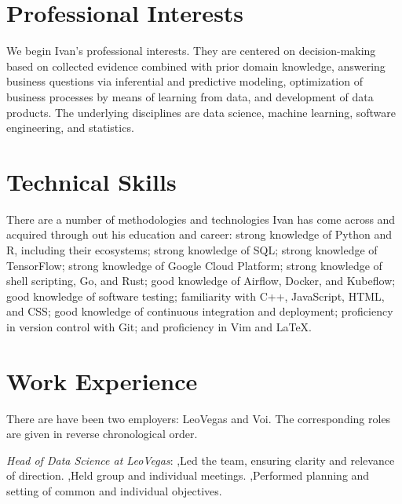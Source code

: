 \documentclass[journal]{IEEEtran}
\begin{document}
\section{Professional Interests} 

We begin Ivan's professional interests. They are centered on decision-making
based on collected evidence combined with prior domain knowledge, answering
business questions via inferential and predictive modeling, optimization of
business processes by means of learning from data, and development of data
products. The underlying disciplines are data science, machine learning,
software engineering, and statistics.

\section{Technical Skills} 

There are a number of methodologies and technologies Ivan has come across and
acquired through out his education and career: strong knowledge of Python and R,
including their ecosystems; strong knowledge of SQL; strong knowledge of
TensorFlow; strong knowledge of Google Cloud Platform; strong knowledge of shell
scripting, Go, and Rust; good knowledge of Airflow, Docker, and Kubeflow; good
knowledge of software testing; familiarity with C++, JavaScript, HTML, and CSS;
good knowledge of continuous integration and deployment; proficiency in version
control with Git; and proficiency in Vim and LaTeX.

\section{Work Experience} 

There are have been two employers: LeoVegas and Voi. The corresponding roles are
given in reverse chronological order.

\date{November 2019--February 2022} \emph{Head of Data Science at LeoVegas}:
\sep Led the team, ensuring clarity and relevance of direction. \sep Held group
and individual meetings. \sep Performed planning and setting of common and
individual objectives.
\end{document}
